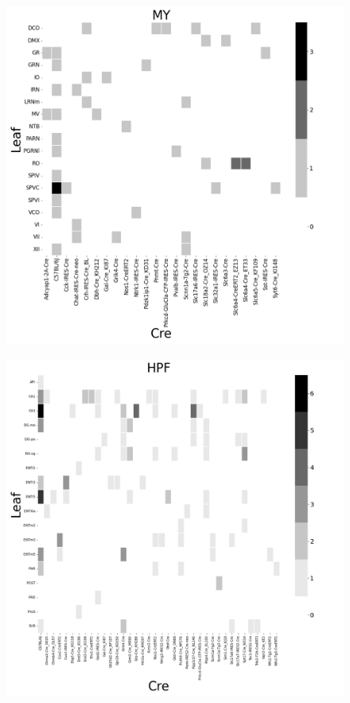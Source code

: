 \begin{figure}[H]
    \centering
    \includegraphics[width = 7in]{figs/MY centroid density.png} 
    \label{fig:my_label}
\end{figure}
\newpage

\begin{figure}[H]
    \centering
    \includegraphics[width = 7in]{figs/HPF centroid density.png} 
    \label{fig:my_label}
\end{figure}
\newpage

